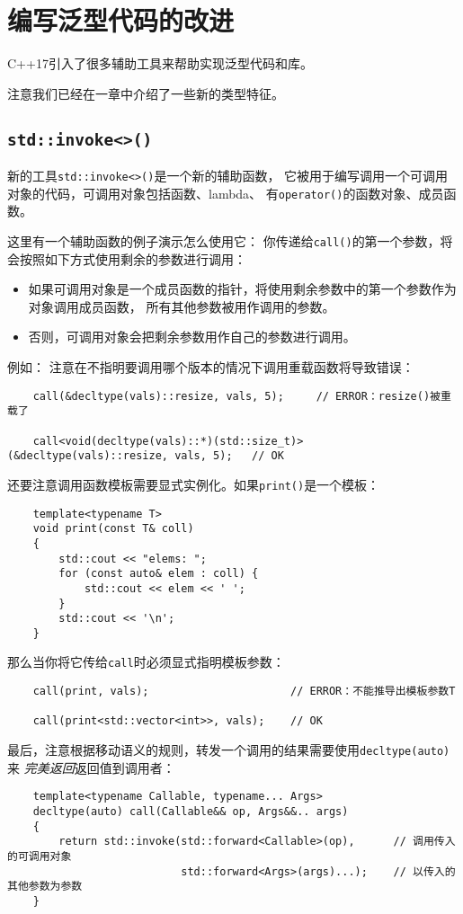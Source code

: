 \chapter{编写泛型代码的改进}\label{ch33}
C++17引入了很多辅助工具来帮助实现泛型代码和库。

注意我们已经在一章中介绍了一些新的类型特征。


\section{\texttt{std::invoke<>()}}\label{ch33.1}
新的工具\texttt{std::invoke<>()}是一个新的辅助函数，
它被用于编写调用一个可调用对象的代码，可调用对象包括函数、lambda、
有\texttt{operator()}的函数对象、成员函数。

这里有一个辅助函数的例子演示怎么使用它：
你传递给\texttt{call()}的第一个参数，将会按照如下方式使用剩余的参数进行调用：
\begin{itemize}
    \item 如果可调用对象是一个成员函数的指针，将使用剩余参数中的第一个参数作为对象调用成员函数，
    所有其他参数被用作调用的参数。
    \item 否则，可调用对象会把剩余参数用作自己的参数进行调用。
\end{itemize}
例如：
注意在不指明要调用哪个版本的情况下调用重载函数将导致错误：
\begin{lstlisting}
    call(&decltype(vals)::resize, vals, 5);     // ERROR：resize()被重载了

    call<void(decltype(vals)::*)(std::size_t)>(&decltype(vals)::resize, vals, 5);   // OK
\end{lstlisting}
还要注意调用函数模板需要显式实例化。如果\texttt{print()}是一个模板：
\begin{lstlisting}
    template<typename T>
    void print(const T& coll)
    {
        std::cout << "elems: ";
        for (const auto& elem : coll) {
            std::cout << elem << ' ';
        }
        std::cout << '\n';
    }
\end{lstlisting}
那么当你将它传给\texttt{call}时必须显式指明模板参数：
\begin{lstlisting}
    call(print, vals);                      // ERROR：不能推导出模板参数T

    call(print<std::vector<int>>, vals);    // OK
\end{lstlisting}
最后，注意根据移动语义的规则，转发一个调用的结果需要使用\texttt{decltype(auto)}来
\emph{完美返回}返回值到调用者：
\begin{lstlisting}
    template<typename Callable, typename... Args>
    decltype(auto) call(Callable&& op, Args&&.. args)
    {
        return std::invoke(std::forward<Callable>(op),      // 调用传入的可调用对象
                           std::forward<Args>(args)...);    // 以传入的其他参数为参数
    }
\end{lstlisting}


